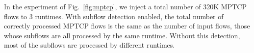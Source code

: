 In the experiment of Fig.~\ref{fig:mptcp}, we inject a total number of 320K MPTCP flows to 3 runtimes. With subflow detection enabled, the total number of correctly processed MPTCP flows is the same as the number of input flows, %
those whose subflows are all processed by the same runtime. Without this detection, most of the subflows are processed by different runtimes. %


